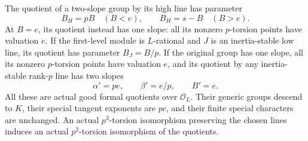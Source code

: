 \begin{lemma}
\label{lem:B-RD69-quotients}
The quotient of a two-slope group by its high line has parameter
\[
 B_H=pB\quad(B<e),\qquad B_H=s-B\quad(B>e).
 \tag{B-RD69.5}
\]
At \(B=e\), its quotient instead has one slope: all its nonzero
\(p\)-torsion points have valuation \(e\).
If the first-level module is \(L\)-rational and \(J\) is an
inertia-stable low line, its quotient has parameter \(B_J=B/p\).
If the original group has one slope, all its nonzero
\(p\)-torsion points have valuation \(e\), and its quotient by
any inertia-stable rank-\(p\) line has two slopes
\[
 \alpha'=pe,\qquad\beta'=e/p,\qquad B'=e.
 \tag{B-RD69.6}
\]
All these are actual good formal quotients over \(\mathcal O_L\).
Their generic groups descend to \(K\), their special tangent
exponents are \(pc\), and their finite special characters are
unchanged. An actual \(p^3\)-torsion isomorphism preserving the
chosen lines induces an actual \(p^2\)-torsion isomorphism of
the quotients.
\end{lemma}
